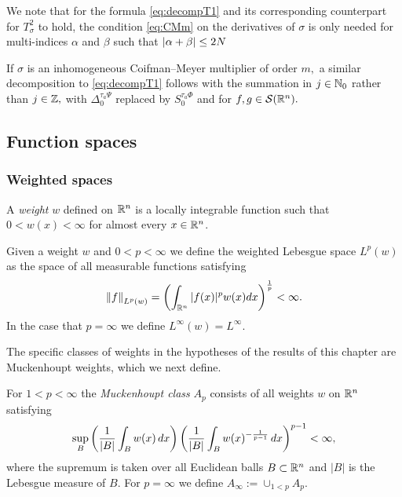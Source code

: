We note that for the formula \eqref{eq:decompT1} and its corresponding counterpart for $T^2_\sigma$ to hold, the condition \eqref{eq:CMm} on the derivatives of $\sigma$ is only needed for multi-indices $\alpha$ and $\beta$ such that  $\left\vert \alpha+\beta \right\vert\le 2N$

If $\sigma$ is an inhomogeneous Coifman--Meyer multiplier of order $m,$ a similar decomposition to \eqref{eq:decompT1} follows  with the summation in $j\in\mathbb{N}_0$ rather than $j\in\mathbb{Z},$  with  $\Delta_0^{\tau_a \Psi}$ replaced by $S_0^{\tau_a\Phi}$ and for $f,g\in {\mathcal{S}}({{\mathbb R}^n}).$




\subsection{Function spaces}

\subsubsection{Weighted spaces}

\begin{dfn}
A \textit{weight} $w$ defined on ${{\mathbb R}^n}$ is a locally integrable function such that $0<w(x)<\infty$ for almost every $x\in{{\mathbb R}^n}$.
\end{dfn}

Given a weight $w$ and $0<p<\infty$ we define the weighted Lebesgue space $L^p(w)$ as the space of all measurable functions satisfying 
\[ \left\|f\right\|_{L^p(w)} = \left(\int_{{\mathbb R}^n} |f(x)|^p w(x)dx\right)^{\frac{1}{p}} < \infty. \]
In the case that $p=\infty$ we define $L^\infty (w) = L^\infty$. 

The specific classes of weights in the hypotheses of the results of this chapter are Muckenhoupt weights, which we next define. 
\begin{dfn}
For $1<p<\infty$ the \textit{Muckenhoupt class} $A_p$ consists of all weights $w$ on ${{\mathbb R}^n}$ satisfying 
 \begin{equation}\label{weight_condition}
 \sup_B\left(\frac{1}{\left\vert B \right\vert}\int_Bw(x)\, dx\right)\left(\frac{1}{\left\vert B \right\vert}\int_Bw(x)^{-\frac{1}{p-1}}\, dx\right)^{p-1}<\infty,
 \end{equation}
where the supremum is taken over all Euclidean balls $B\subset{{\mathbb R}^n}$ and $|B|$ is the Lebesgue measure of $B$. For $p=\infty$ we define $A_\infty := \cup_{1<p} A_p$. 
\end{dfn}

